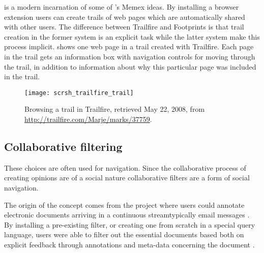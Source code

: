 %
is a modern incarnation of some of \citeauthor{bush45}'s Memex ideas.
By installing a browser extension users can
create trails of web pages which are automatically shared with other users.
The difference between Trailfire and Footprints is that trail creation in the
former system is an explicit task while the latter system make this process
implicit.  shows one web page in a trail
created with Trailfire. Each page in the trail gets an information box with
navigation controls for moving through the trail, in addition to information
about why this particular page was included in the trail.

\begin{figure}
  \texttt{[image: scrsh\_trailfire\_trail]}
  \caption[Trailfire Trail]{
    Browsing a trail in Trailfire,
    retrieved May 22, 2008, from
    \url{http://trailfire.com/Marje/marks/37759}.
  }
  \label{figure:scrsh.trailfire.trail}
\end{figure}

\subsection{Collaborative filtering}
\label{section:navigation.applied.forms.collaborative.filtering}

 
These choices are often used for navigation. Since the collaborative process
of creating opinions are of a social nature collaborative filters are a form
of social navigation.

The origin of the concept comes from the 
project where users could annotate electronic documents arriving in a
continuous stream\dash{}typically email messages \citep[]{goldberg92}. By
installing a pre-existing filter, or creating one from scratch in a
special query language, users were able to filter out the essential documents
based both on explicit feedback through annotations and
meta-data concerning the document \citep[]{goldberg92}.

